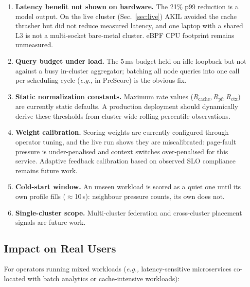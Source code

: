 \documentclass[10pt,conference,a4paper]{IEEEtran}
\newcommand{\akil}{\textsc{AKIL}\xspace}
\newcommand{\sys}{\akil}
\newcommand{\eg}{\emph{e.g.,}\xspace}
\begin{document}
\begin{enumerate}[leftmargin=*,topsep=2pt,itemsep=1pt]
  \item \textbf{Latency benefit not shown on hardware.} The 21\% p99 reduction is a model
        output. On the live cluster (Sec.~\ref{sec:live}) \sys avoided the cache thrasher
        but did not reduce measured latency, and one laptop with a shared L3 is not a
        multi-socket bare-metal cluster. eBPF CPU footprint remains unmeasured.
  \item \textbf{Query budget under load.} The 5\,ms budget held on idle loopback but not
        against a busy in-cluster aggregator; batching all node queries into one call per
        scheduling cycle (\eg in PreScore) is the obvious fix.
  \item \textbf{Static normalization constants.} Maximum rate values ($R_{\mathrm{cache}},
        R_{\mathrm{pf}}, R_{\mathrm{ctx}}$) are currently static defaults. A production
        deployment should dynamically derive these thresholds from cluster-wide rolling
        percentile observations.
  \item \textbf{Weight calibration.} Scoring weights are currently configured through
        operator tuning, and the live run shows they are miscalibrated: page-fault pressure
        is under-penalised and context switches over-penalised for this service. Adaptive feedback calibration based on observed SLO compliance
        remains future work.
  \item \textbf{Cold-start window.} An unseen workload is scored as a quiet one until its
        own profile fills ($\approx$10\,s): neighbour pressure counts, its own does not.
  \item \textbf{Single-cluster scope.} Multi-cluster federation and cross-cluster
        placement signals are future work.
\end{enumerate}

\subsection{Impact on Real Users}

For operators running mixed workloads (\eg latency-sensitive microservices co-located
with batch analytics or cache-intensive workloads):
\end{document}
